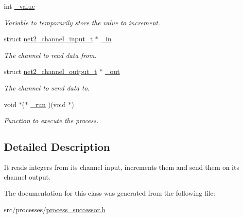 \begin{DoxyCompactItemize}
\item 
\hypertarget{structprocess__successor__int__t_adab1d50bdaa98b5276673cb49b612fde}{int \hyperlink{structprocess__successor__int__t_adab1d50bdaa98b5276673cb49b612fde}{\-\_\-value}}\label{structprocess__successor__int__t_adab1d50bdaa98b5276673cb49b612fde}

\begin{DoxyCompactList}\small\item\em Variable to temporarily store the value to increment. \end{DoxyCompactList}\item 
\hypertarget{structprocess__successor__int__t_a728f7ed017c840f1fe227adbc7df3c89}{struct \hyperlink{structnet2__channel__input__t}{net2\-\_\-channel\-\_\-input\-\_\-t} $\ast$ \hyperlink{structprocess__successor__int__t_a728f7ed017c840f1fe227adbc7df3c89}{\-\_\-in}}\label{structprocess__successor__int__t_a728f7ed017c840f1fe227adbc7df3c89}

\begin{DoxyCompactList}\small\item\em The channel to read data from. \end{DoxyCompactList}\item 
\hypertarget{structprocess__successor__int__t_aff6997851f624dd26fe8ba56bfae2fd1}{struct \hyperlink{structnet2__channel__output__t}{net2\-\_\-channel\-\_\-output\-\_\-t} $\ast$ \hyperlink{structprocess__successor__int__t_aff6997851f624dd26fe8ba56bfae2fd1}{\-\_\-out}}\label{structprocess__successor__int__t_aff6997851f624dd26fe8ba56bfae2fd1}

\begin{DoxyCompactList}\small\item\em The channel to send data to. \end{DoxyCompactList}\item 
\hypertarget{structprocess__successor__int__t_ad654ff32653fc6c2d59ae2b632f70e28}{void $\ast$($\ast$ \hyperlink{structprocess__successor__int__t_ad654ff32653fc6c2d59ae2b632f70e28}{\-\_\-run} )(void $\ast$)}\label{structprocess__successor__int__t_ad654ff32653fc6c2d59ae2b632f70e28}

\begin{DoxyCompactList}\small\item\em Function to execute the process. \end{DoxyCompactList}\end{DoxyCompactItemize}


\subsection{Detailed Description}
It reads integers from its channel input, increments them and send them on its channel output. 

The documentation for this class was generated from the following file\-:\begin{DoxyCompactItemize}
\item 
src/processes/\hyperlink{process__successor_8h}{process\-\_\-successor.\-h}\end{DoxyCompactItemize}
